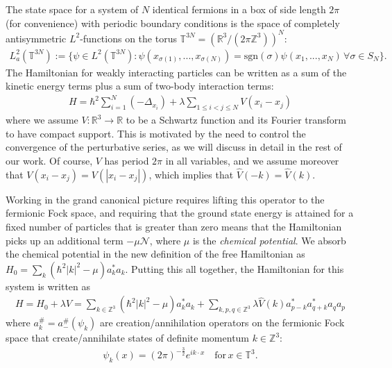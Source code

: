 The state space for a system of $N$ identical fermions in a box of side length $2\pi$ (for
convenience) with periodic boundary conditions is the space of completely antisymmetric
$L^2$-functions on the torus $\mathbb{T}^{3N} = (\mathbb{R}^3/(2\pi\mathbb{Z}^3))^N$:
\begin{align*}
	L^2_a(\mathbb{T}^{3N}) := \{\psi\in L^2(\mathbb{T}^{3N})
	: \psi(x_{\sigma(1)}, ..., x_{\sigma(N)})
	= \mathrm{sgn}(\sigma)\psi(x_1, ..., x_N) \,\forall \sigma \in S_N\}.
\end{align*}
The Hamiltonian for weakly interacting particles can be written as a sum of
the kinetic energy terms plus a sum of two-body interaction terms:
\begin{align}
	\label{eq:hamiltonian}
	H = \hbar^2 \sum_{i=1}^{N}(-\Delta_{x_i}) + \lambda \sum_{1 \leq i <
	j \leq N}V(x_i - x_j)
\end{align}
where we assume $V : \mathbb{R}^3 \to \mathbb{R}$ to be a Schwartz function and its Fourier
transform to have compact support. This is motivated by the need to control the
convergence of the perturbative series, as we will discuss in detail in the rest of our work.
Of course, $V$ has period $2\pi$ in all variables, and we assume moreover that $V(x_i - x_j) =
V(|x_i - x_j|)$, which implies that $\hat{V}(-k) = \hat{V}(k)$.

Working in the grand canonical picture requires lifting this operator to the fermionic Fock
space, and requiring that the ground state energy is attained for a fixed number of particles
that is greater than zero means that the Hamiltonian picks up an additional term $-\mu\mathcal{N}$,
where $\mu$ is the \textit{chemical potential}. We absorb the chemical potential in the new
definition of the free Hamiltonian as $H_0=\sum_k(\hbar^2\vert k\vert^2-\mu)a^*_ka_k$. Putting
this all together, the Hamiltonian for this system is written as
\begin{align*}
	H = H_0 + \lambda V = \sum_{k \in \mathbb{Z}^3} (\hbar^2|k|^2 - \mu) a^*_k a_k
	+ \sum_{k,p,q \in \mathbb{Z}^3} \lambda\hat{V}(k) a^*_{p-k} a^*_{q+k} a_q a_p
\end{align*}
where $a^\#_k=a^\#_-(\psi_k)$ are creation/annihilation operators on the fermionic Fock space
that create/annihilate states of definite momentum $k\in\mathbb{Z}^3$:
\begin{align*}
	\psi_k(x) = (2\pi)^{-\frac{3}{2}}e^{ik\cdot x}\quad\text{for}\,x\in\mathbb{T}^3.
\end{align*}

